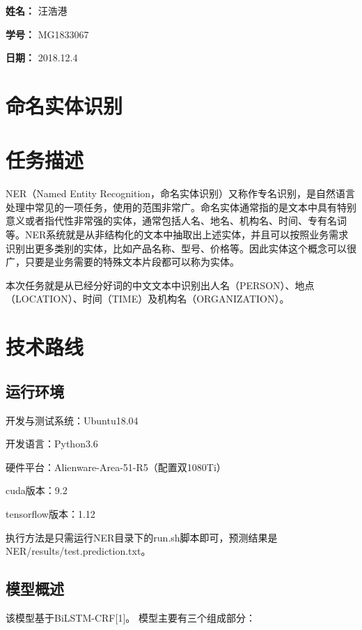 \documentclass[UTF8]{article}
\begin{document}
    
{\flushleft \bf \Large 姓名：} 汪浩港

{\flushleft \bf \Large 学号：} MG1833067

{\flushleft \bf \Large 日期：} 2018.12.4

\section*{命名实体识别}
    
    
\section{任务描述}

NER（Named Entity Recognition，命名实体识别）又称作专名识别，是自然语言处理中常见的一项任务，使用的范围非常广。命名实体通常指的是文本中具有特别意义或者指代性非常强的实体，通常包括人名、地名、机构名、时间、专有名词等。NER系统就是从非结构化的文本中抽取出上述实体，并且可以按照业务需求识别出更多类别的实体，比如产品名称、型号、价格等。因此实体这个概念可以很广，只要是业务需要的特殊文本片段都可以称为实体。

本次任务就是从已经分好词的中文文本中识别出人名（PERSON）、地点（LOCATION）、时间（TIME）及机构名（ORGANIZATION）。



\section{技术路线}

\subsection{运行环境}
开发与测试系统：Ubuntu18.04

开发语言：Python3.6

硬件平台：Alienware-Area-51-R5（配置双1080Ti）

cuda版本：9.2

tensorflow版本：1.12


执行方法是只需运行NER目录下的run.sh脚本即可，预测结果是NER/results/test.prediction.txt。
\subsection{模型概述}
该模型基于BiLSTM-CRF[1]。 模型主要有三个组成部分：
\end{document}
